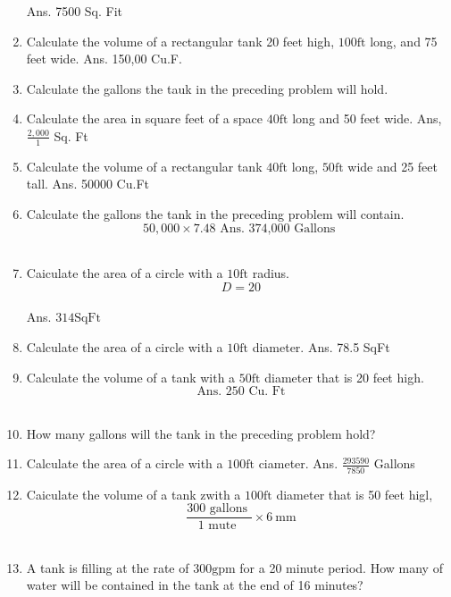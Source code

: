 \begin{enumerate}
Ans. 7500 Sq. Fit\\
\item Calculate the volume of a rectangular tank 20 feet high, $100 \mathrm{ft}$ long, and 75 feet wide. Ans. 150,00 Cu.F.\\
\item Calculate the gallons the tauk in the preceding problem will hold.\\
\item Calculate the area in square feet of a space $40 \mathrm{ft}$ long and 50 feet wide. Ans, $\frac{2,000}{1}$ Sq. Ft\\
\item Calculate the volume of a rectangular tank $40 \mathrm{ft}$ long, $50 \mathrm{ft}$ wide and 25 feet tall. Ans. 50000 Cu.Ft\\
\item Calculate the gallons the tank in the preceding problem will contain.\\
$$
50,000 \times 7.48 \text { Ans. 374,000 Gallons }
$$\\
\item Caiculate the area of a circle with a $10 \mathrm{ft}$ radius.\\
$$
D=20
$$\\
Ans. $314 \mathrm{SqFt}$\\
\item Calculate the area of a circle with a $10 \mathrm{ft}$ diameter. Ans. 78.5 SqFt\\
\item Calculate the volume of a tank with a $50 \mathrm{ft}$ diameter that is 20 feet high.\\
$$
\text { Ans. } 250 \text { Cu. Ft }
$$\\
\item How many gallons will the tank in the preceding problem hold?\\
\item Calculate the area of a circle with a $100 \mathrm{ft}$ ciameter. Ans. $\frac{293590}{7850}$ Gallons\\
\item Caiculate the volume of a tank zwith a $100 \mathrm{ft}$ diameter that is 50 feet higl,\\
$$
\frac{300 \text { gallons }}{1 \text { mute }} \times 6 \mathrm{~mm}
$$\\
\item A tank is filling at the rate of $300 \mathrm{gpm}$ for a 20 minute period. How many of water will be contained in the tank at the end of 16 minutes?\\

\end{enumerate}
